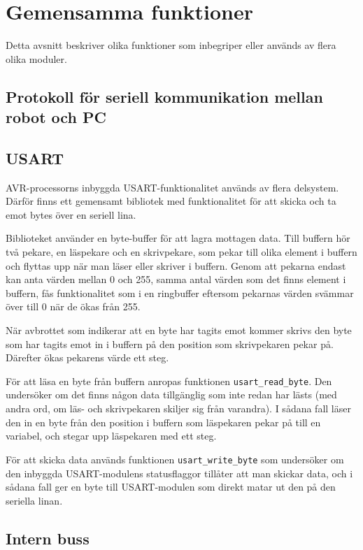 \documentclass[a4paper,12pt]{article}
\begin{document}
\section{Gemensamma funktioner}
Detta avsnitt beskriver olika funktioner som inbegriper eller används av flera olika moduler.

\subsection{Protokoll för seriell kommunikation mellan robot och PC}
\label{sec:bt-protokoll}

\subsection{USART}
\label{sec:usart}
AVR-processorns inbyggda USART-funktionalitet används av flera delsystem. Därför finns ett gemensamt bibliotek med funktionalitet för att skicka och ta emot bytes över en seriell lina.

Biblioteket använder en byte-buffer för att lagra mottagen data. Till buffern hör två pekare, en läspekare och en skrivpekare, som pekar till olika element i buffern och flyttas upp när man läser eller skriver i buffern. Genom att pekarna endast kan anta värden mellan 0 och 255, samma antal värden som det finns element i buffern, fås funktionalitet som i en ringbuffer eftersom pekarnas värden svämmar över till 0 när de ökas från 255.

När avbrottet som indikerar att en byte har tagits emot kommer skrivs den byte som har tagits emot in i buffern på den position som skrivpekaren pekar på. Därefter ökas pekarens värde ett steg.

För att läsa en byte från buffern anropas funktionen \verb|usart_read_byte|. Den undersöker om det finns någon data tillgänglig som inte redan har lästs (med andra ord, om läs- och skrivpekaren skiljer sig från varandra). I sådana fall läser den in en byte från den position i buffern som läspekaren pekar på till en variabel, och stegar upp läspekaren med ett steg.

För att skicka data används funktionen \verb|usart_write_byte| som undersöker om den inbyggda USART-modulens statusflaggor tillåter att man skickar data, och i sådana fall ger en byte till USART-modulen som direkt matar ut den på den seriella linan.

\subsection{Intern buss}
\label{sec:bus}
\end{document}
